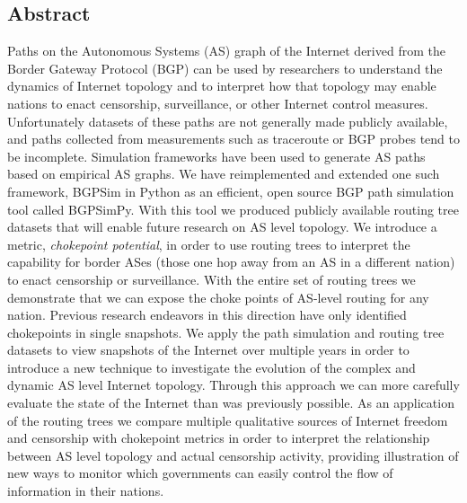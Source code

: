 \documentclass{article}
\begin{document}
\begin{multicols}{2}

\section{Abstract}     
Paths on the Autonomous Systems (AS) graph of the Internet
derived from the Border Gateway Protocol (BGP) can be used by researchers to
understand the dynamics of Internet topology and to interpret how that
topology may enable nations to enact censorship, surveillance, or other
Internet control measures. Unfortunately datasets of these paths are not
generally made publicly available, and paths collected from measurements such as
traceroute or BGP probes tend to be incomplete. Simulation
frameworks have been used to generate AS paths based on empirical AS graphs.
We have reimplemented and extended one such framework, BGPSim \cite{quicksand} in Python as
an efficient, open source BGP path simulation tool called BGPSimPy. With this
tool we produced publicly available routing tree datasets that will enable
future research on AS level topology. We introduce a metric, \textit{chokepoint potential},
in order to use routing trees to interpret the capability for border ASes (those one hop away from
an AS in a different nation) to enact censorship or surveillance. With the entire set of
routing trees we demonstrate that we can expose the choke points of AS-level routing for
any nation. Previous research endeavors in this
direction have only identified chokepoints in single snapshots. We apply the
path simulation and routing tree datasets to view snapshots of the Internet
over multiple years in order to introduce a new technique to investigate the
evolution of the complex and dynamic AS level Internet topology. Through this approach we
can more carefully evaluate the state of the Internet than was previously possible. As an
application of the routing trees we compare multiple qualitative sources of
Internet freedom and censorship with chokepoint metrics in order to interpret
the relationship between AS level topology and actual censorship activity, providing
illustration of new ways to monitor which governments can easily control the flow of 
information in their nations.


\end{multicols}
\end{document}
